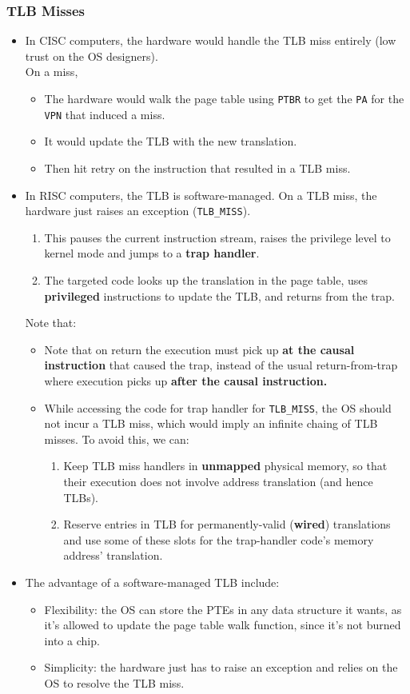 \documentclass[10pt]{report}
\begin{document}
\subsubsection{TLB Misses}
\begin{itemize}
\item In CISC computers, the hardware would handle the TLB miss entirely (low trust on the OS designers).
\\On a miss,
\begin{itemize}
    \item The hardware would walk the page table using \texttt{PTBR} to get the \texttt{PA} for the \texttt{VPN} that induced a miss.
    \item It would update the TLB with the new translation.
    \item Then hit retry on the instruction that resulted in a TLB miss.
\end{itemize}
\item In RISC computers, the TLB is software-managed. On a TLB miss, the hardware just raises an exception (\texttt{TLB\_MISS}).
\begin{enumerate}
\item This pauses the current instruction stream, raises the privilege level to kernel mode and jumps to a \textbf{trap handler}.
\item The targeted code looks up the translation in the page table, uses \textbf{privileged} instructions to update the TLB, and returns from the trap.
\end{enumerate}
Note that:
\begin{itemize}
    \item Note that on return the execution must pick up \textbf{at the causal instruction} that caused the trap, instead of the usual return-from-trap where execution picks up \textbf{after the causal instruction.}
    \item While accessing the code for trap handler for \texttt{TLB\_MISS}, the OS should not incur a TLB miss, which would imply an infinite chaing of TLB misses. To avoid this, we can:
    \begin{enumerate}
        \item Keep TLB miss handlers in \textbf{unmapped} physical memory, so that their execution does not involve address translation (and hence TLBs).
        \item Reserve entries in TLB for permanently-valid (\textbf{wired}) translations and use some of these slots for the trap-handler code's memory address' translation.
    \end{enumerate}
\end{itemize}
\item The advantage of a software-managed TLB include:
\begin{itemize}
    \item Flexibility: the OS 
    can store the PTEs in any data structure it wants, as it's 
    allowed to update the page table walk function, since it's not 
    burned into a chip.
    \item Simplicity: the hardware just has to raise an exception and relies on the OS to resolve the TLB miss. 
\end{itemize} 
\end{itemize}
\end{document}
